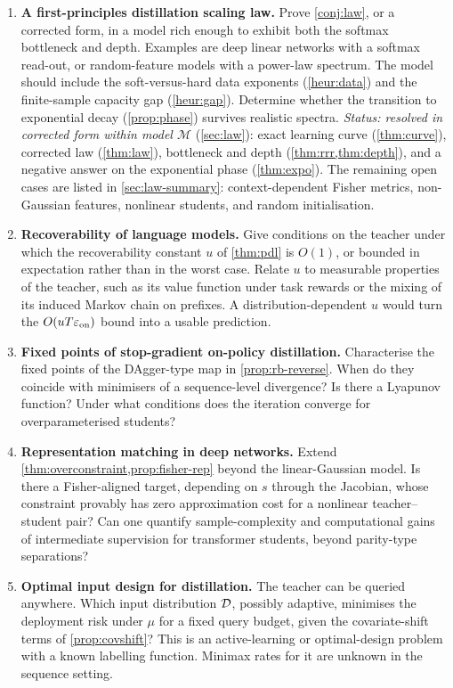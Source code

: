\begin{enumerate}[leftmargin=*,label=\textbf{P\arabic*.}]
\item \textbf{A first-principles distillation scaling law.} Prove \cref{conj:law}, or a corrected form, in a model
rich enough to exhibit both the softmax bottleneck and depth. Examples are deep linear networks with a
softmax read-out, or random-feature models with a power-law spectrum. The model should include the
soft-versus-hard data exponents (\cref{heur:data}) and the finite-sample capacity gap (\cref{heur:gap}).
Determine whether the transition to exponential decay (\cref{prop:phase}) survives realistic spectra.
\emph{Status: resolved in corrected form within model $\mathcal M$} (\cref{sec:law}): exact learning curve
(\cref{thm:curve}), corrected law (\cref{thm:law}), bottleneck and depth (\cref{thm:rrr,thm:depth}), and a negative
answer on the exponential phase (\cref{thm:expo}). The remaining open cases are listed in \cref{sec:law-summary}:
context-dependent Fisher metrics, non-Gaussian features, nonlinear students, and random initialisation.

\item \textbf{Recoverability of language models.} Give conditions on the teacher under which the
recoverability constant $u$ of \cref{thm:pdl} is $O(1)$, or bounded in expectation rather than in the worst case.
Relate $u$ to measurable properties of the teacher, such as its value function under task rewards or the
mixing of its induced Markov chain on prefixes. A distribution-dependent $u$ would turn the $O(uT\varepsilon_{\mathrm{on}})$
bound into a usable prediction.

\item \textbf{Fixed points of stop-gradient on-policy distillation.} Characterise the fixed points of the
DAgger-type map in \cref{prop:rb-reverse}. When do they coincide with minimisers of a sequence-level
divergence? Is there a Lyapunov function? Under what conditions does the iteration converge for
overparameterised students?

\item \textbf{Representation matching in deep networks.} Extend \cref{thm:overconstraint,prop:fisher-rep} beyond the
linear-Gaussian model. Is there a Fisher-aligned target, depending on $s$ through the Jacobian, whose
constraint provably has zero approximation cost for a nonlinear teacher--student pair? Can one quantify
sample-complexity and computational gains of intermediate supervision for transformer students, beyond
parity-type separations?

\item \textbf{Optimal input design for distillation.} The teacher can be queried anywhere. Which input
distribution $\mathcal{D}$, possibly adaptive, minimises the deployment risk under $\mu$ for a fixed query budget,
given the covariate-shift terms of \cref{prop:covshift}? This is an active-learning or optimal-design problem
with a known labelling function. Minimax rates for it are unknown in the sequence setting.


\end{enumerate}
